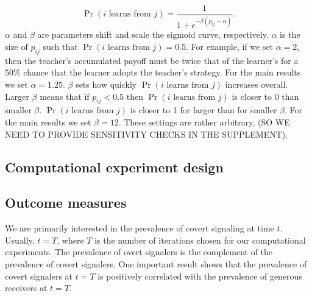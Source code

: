 \documentclass[11pt,letterpaper]{article}
\begin{document}
\begin{equation}
  \Pr(\text{$i$ learns from $j$}) = \frac{1}{1 + e^{-\beta(p_{ij} - \alpha)}}.
\end{equation}
\noindent
$\alpha$ and $\beta$ are parameters shift and scale the sigmoid curve, respectively. 
$\alpha$ is the size of $p_{ij}$ such that $\Pr(\text{$i$ learns from $j$}) = 0.5$. %
For example, if we set $\alpha = 2$, then the teacher's accumulated payoff
must be twice that of the learner's for a 50\% chance that the learner 
adopts the teacher's strategy. 
For the main results we set $\alpha=1.25$. $\beta$ sets how quickly 
$\Pr(\text{$i$ learns from $j$})$ increases overall. Larger $\beta$ means that
if $p_{ij} < 0.5$ then $\Pr(\text{$i$ learns from $j$})$ is closer to 0 than smaller $\beta$. 
$\Pr(\text{$i$ learns from $j$})$ is closer to 1 for larger than for smaller $\beta$. For the main
results we set $\beta = 12$. These settings are rather arbitrary, (SO WE NEED
TO PROVIDE SENSITIVITY CHECKS IN THE SUPPLEMENT).


\subsection{Computational experiment design}

\subsection{Outcome measures}

We are primarily interested in the prevalence of covert signaling at time
$t$. Usually, $t=T$, where $T$ is the number of iterations chosen for our 
computational experiments. The prevalence of overt signalers is the complement 
of the prevalence of covert signalers. One important result shows that the
prevalence of covert signalers at $t=T$ is positively correlated with the
prevalence of generous receivers at $t=T$.  
\end{document}
